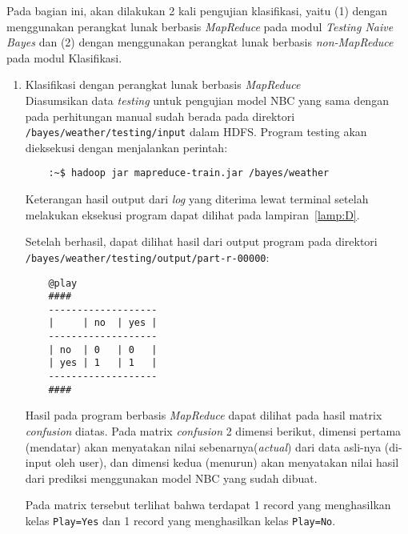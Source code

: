 Pada bagian ini, akan dilakukan 2 kali pengujian klasifikasi, yaitu (1) dengan menggunakan perangkat lunak berbasis \textit{MapReduce} pada modul \textit{Testing Naive Bayes} dan (2) dengan menggunakan perangkat lunak berbasis \textit{non-MapReduce} pada modul Klasifikasi.
\begin{enumerate}
	\item{Klasifikasi dengan perangkat lunak berbasis \textit{MapReduce}}\\
	Diasumsikan data \textit{testing} untuk pengujian model NBC yang sama dengan pada perhitungan manual sudah berada pada direktori \texttt{/bayes/weather/testing/input} dalam HDFS. Program testing akan dieksekusi dengan menjalankan perintah:
	\begin{lstlisting}
	:~$ hadoop jar mapreduce-train.jar /bayes/weather
	\end{lstlisting}
	
	Keterangan hasil output dari \textit{log} yang diterima lewat terminal setelah melakukan eksekusi program dapat dilihat pada lampiran~\ref{lamp:D}.
	
	Setelah berhasil, dapat dilihat hasil dari output program pada direktori\\ \texttt{/bayes/weather/testing/output/part-r-00000}:
	\begin{lstlisting}
	@play
	####
	-------------------
	|     | no  | yes |
	-------------------
	| no  | 0   | 0   |
	| yes | 1   | 1   |
	-------------------
	####
	\end{lstlisting}
	Hasil pada program berbasis \textit{MapReduce} dapat dilihat pada hasil matrix \textit{confusion} diatas. Pada matrix \textit{confusion} 2 dimensi berikut, dimensi pertama (mendatar) akan menyatakan nilai sebenarnya(\textit{actual}) dari data asli-nya (di-input oleh user), dan dimensi kedua (menurun) akan menyatakan nilai hasil dari prediksi menggunakan model NBC yang sudah dibuat.
	
	Pada matrix tersebut terlihat bahwa terdapat 1 record yang menghasilkan kelas \texttt{Play=Yes} dan 1 record yang menghasilkan kelas \texttt{Play=No}.
	

\end{enumerate}
